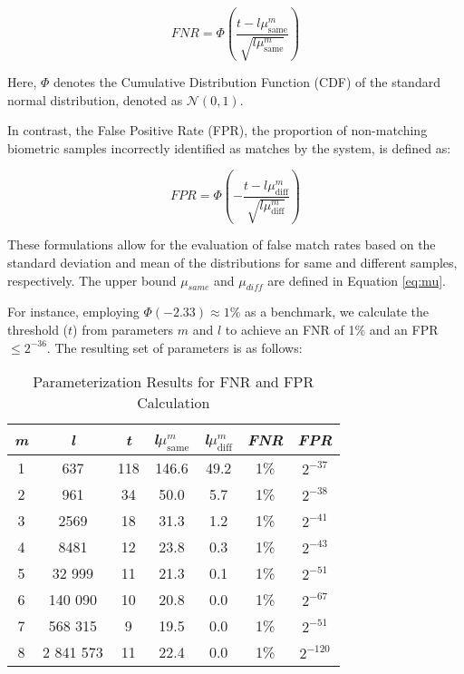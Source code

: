 \begin{equation}
    \label{eq:fnr}
    FNR = \Phi\left( \frac{t - l\mu_{\text{same}}^m}{\sqrt{l\mu_{\text{same}}^m}} \right)
\end{equation}

Here, \(\Phi\) denotes the Cumulative Distribution Function (CDF) of the standard normal distribution, denoted as \(\mathcal{N}(0, 1)\).

In contrast, the False Positive Rate (FPR), the proportion of non-matching biometric samples incorrectly identified as matches by the system, is defined as:

\begin{equation}
    \label{eq:fpr}
    FPR = \Phi\left(- \frac{t - l\mu_{\text{diff}}^m}{\sqrt{l\mu_{\text{diff}}^m}} \right)
\end{equation}

These formulations allow for the evaluation of false match rates based on the standard deviation and mean of the distributions for same and different samples, respectively. The upper bound \(\mu_{same}\) and \(\mu_{diff}\) are defined in Equation \ref{eq:mu}.

For instance, employing \(\Phi(-2.33) \approx 1\%\) as a benchmark, we calculate the threshold (\(t\)) from parameters \(m\) and \(l\) to achieve an FNR of 1\% and an FPR \(\leq 2^{-36} \). The resulting set of parameters is as follows: 

\begin{table}[htbp] 
    \centering
    \begin{tabular}{|c|c|c|c|c|c|c|}
        \hline
        \textit{m} & \textit{l} & \textit{t} & \textit{l}\(\mu_{\text{same}}^m\) & \textit{l}\(\mu_{\text{diff}}^m\) & \textit{FNR} & \textit{FPR} \\
        \hline
        1 & 637 & 118 & 146.6 & 49.2 & 1\% & \(2^{-37}\) \\
        2 & 961 & 34 & 50.0 & 5.7 & 1\% & \(2^{-38}\) \\
        3 & 2569 & 18 & 31.3 & 1.2 & 1\% & \(2^{-41}\) \\
        4 & 8481 & 12 & 23.8 & 0.3 & 1\% & \(2^{-43}\) \\
        5 & 32 999 & 11 & 21.3 & 0.1 & 1\% & \(2^{-51}\) \\
        6 & 140 090 & 10 & 20.8 & 0.0 & 1\% & \(2^{-67}\) \\
        7 & 568 315 & 9 & 19.5 & 0.0 & 1\% & \(2^{-51}\) \\
        8 & 2 841 573 & 11 & 22.4 & 0.0 & 1\% & \(2^{-120}\) \\
        \hline
    \end{tabular}
    \caption{Parameterization Results for FNR and FPR Calculation}
    \label{tab:parameterization}
\end{table}



